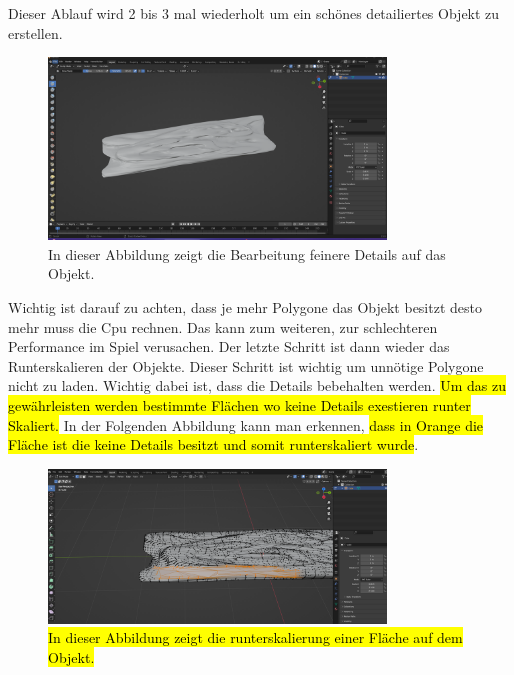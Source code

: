 \noindent Dieser Ablauf wird 2 bis 3 mal wiederholt um ein schönes detailiertes Objekt zu erstellen.
\begin{figure}[H]
    \centering
    \includegraphics[width=0.8\textwidth]{chapters/13/images/HolzBrett2.png}
    \caption{In dieser Abbildung zeigt die Bearbeitung feinere Details auf das Objekt.}
    \label{UST-16}
\end{figure}
\noindent Wichtig ist darauf zu achten, dass je mehr Polygone das Objekt besitzt desto mehr muss die Cpu rechnen. Das kann zum weiteren, zur schlechteren Performance im Spiel verusachen. Der letzte Schritt ist dann wieder das Runterskalieren der Objekte. Dieser Schritt ist wichtig um unnötige Polygone nicht zu laden. Wichtig dabei ist, dass die Details bebehalten werden. \hl{Um das zu gewährleisten werden bestimmte Flächen wo keine Details exestieren runter Skaliert.} In der Folgenden Abbildung kann man erkennen, \hl{dass in Orange die Fläche ist die keine Details besitzt und somit runterskaliert wurde}.

\begin{figure}[H]
    \centering
    \includegraphics[width=0.8\textwidth]{chapters/13/images/HolzBrett3.png}
    \caption{\hl{In dieser Abbildung zeigt die runterskalierung einer Fläche auf dem Objekt.}}
    \label{UST-17}
\end{figure}